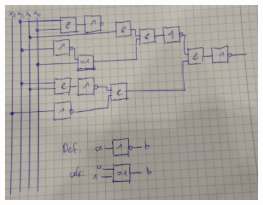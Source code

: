 \documentclass[a4paper]{article}
\begin{document}
\begin{enumerate}[label=\alph*)]
\begin{figure}[h!]
\begin{center}
			\includegraphics[scale=0.3]{Aufgabe1d.png}
		\end{center}
	\end{figure} 
\end{enumerate}
\end{document}
